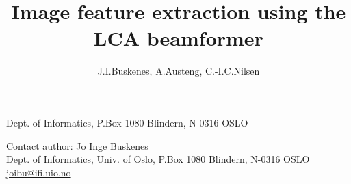 \documentclass[
   UAM                                          %
 , 12pt                                         %
 , xelatex                                      %
 , bibtex                                       %
 , layout
]{common/mytemplate}
\begin{document}
\pagestyle{plain}



\title{Image feature extraction using the LCA beamformer}%
%
\author{J.I.Buskenes\firstAddress, A.Austeng\firstAddress, C.-I.C.Nilsen\firstAddress}%
%
\begin{contact}
  \firstAddress Dept. of Informatics, P.Box 1080 Blindern, N-0316 OSLO
\end{contact}%
%
\begin{contact}
Contact author: Jo Inge Buskenes\\
Dept. of Informatics, Univ. of Oslo, P.Box 1080 Blindern, N-0316 OSLO\\
\href{mailto:joibu@ifi.uio.no}{joibu@ifi.uio.no}
\end{contact}%
%
\end{document}
